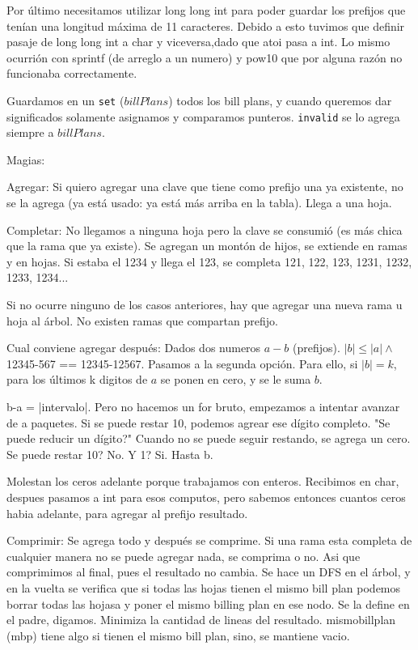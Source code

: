 Por último necesitamos utilizar long long int para poder guardar los prefijos que tenían una longitud máxima de 11 caracteres.
Debido a esto tuvimos que definir pasaje de long long int a char y viceversa,dado que atoi pasa a int. 
Lo mismo ocurrión con sprintf (de arreglo a un numero) y pow10 que por alguna razón no funcionaba correctamente. 



Guardamos en un {\tt set} ($billPlans$) todos los bill plans, y cuando queremos
dar significados solamente asignamos y comparamos punteros. {\tt invalid} se lo
agrega siempre a $billPlans$.

Magias:

Agregar: Si quiero agregar una clave que tiene como prefijo una ya existente,
no se la agrega (ya está usado: ya está más arriba en la tabla). Llega
a una hoja.

Completar: No llegamos a ninguna hoja pero la clave se consumió (es más
chica que la rama que ya existe). Se agregan un montón de hijos, se extiende
en ramas y en hojas. Si estaba el 1234 y llega el 123, se completa 121, 122,
123, 1231, 1232, 1233, 1234...

Si no ocurre ninguno de los casos anteriores, hay que agregar una nueva rama u
hoja al árbol. No existen ramas que compartan prefijo. 

Cual conviene agregar después: Dados dos numeros $a-b$ (prefijos). $|b| \le |a|
\land$ 12345-567 == 12345-12567. Pasamos a la segunda opción. Para ello, si
$|b|=k$, para los últimos k digitos de $a$ se ponen en cero, y se le suma $b$.

b-a = |intervalo|. Pero no hacemos un for bruto, empezamos a intentar avanzar de
a paquetes. Si se puede restar 10, podemos agrear ese dígito completo. "Se puede
reducir un dígito?" Cuando no se puede seguir restando, se agrega un cero. Se
puede restar 10? No. Y 1? Si. Hasta b.

Molestan los ceros adelante porque trabajamos con enteros. Recibimos en char,
despues pasamos a int para esos computos, pero sabemos entonces cuantos ceros
habia adelante, para agregar al prefijo resultado.

Comprimir: Se agrega todo y después se comprime. Si una rama esta completa de cualquier
manera no se puede agregar nada, se comprima o no. Asi que comprimimos al final, pues
el resultado no cambia. Se hace un DFS en el árbol, y en la vuelta se verifica
que si todas las hojas tienen el mismo bill plan podemos borrar todas las hojasa y
poner el mismo billing plan en ese nodo. Se la define en el padre, digamos. Minimiza
la cantidad de lineas del resultado. mismobillplan (mbp) tiene algo si tienen el mismo
bill plan, sino, se mantiene vacio.

